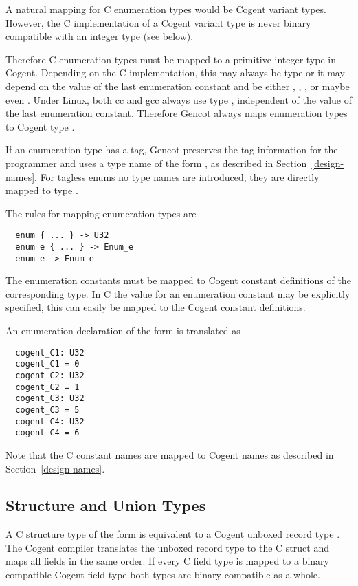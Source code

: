 A natural mapping for C enumeration types would be Cogent variant types. However, the C implementation
of a Cogent variant type is never binary compatible with an integer type (see below). 

Therefore C enumeration types must be mapped to a primitive integer type in Cogent. Depending on the C
implementation, this may always be type  or it may depend on the value of the last enumeration
constant and be either , , , or maybe even . Under Linux, both cc
and gcc always use type , independent of the value of the last enumeration constant. 
Therefore Gencot always maps enumeration types to Cogent type .

If an enumeration type has a tag, Gencot preserves the tag information for the programmer and uses
a type name of the form , as described in Section~\ref{design-names}. For tagless enums
no type names are introduced, they are directly mapped to type .

The rules for mapping enumeration types are
\begin{verbatim}
  enum { ... } -> U32
  enum e { ... } -> Enum_e
  enum e -> Enum_e
\end{verbatim}

The enumeration constants must be mapped to Cogent constant definitions of the corresponding type. In 
C the value for an enumeration constant may be explicitly specified, this can easily be mapped to
the Cogent constant definitions.

An enumeration declaration of the form  is translated as
\begin{verbatim}
  cogent_C1: U32
  cogent_C1 = 0
  cogent_C2: U32
  cogent_C2 = 1
  cogent_C3: U32
  cogent_C3 = 5
  cogent_C4: U32
  cogent_C4 = 6
\end{verbatim}
Note that the C constant names are mapped to Cogent names as described in Section~\ref{design-names}.

\subsection{Structure and Union Types}
\label{design-types-struct}

A C structure type of the form  is equivalent to a Cogent unboxed record type .
The Cogent compiler translates the unboxed record type to the C struct and maps all fields in the same order.
If every C field type is mapped to a binary compatible Cogent field type both types are binary compatible as a whole.

